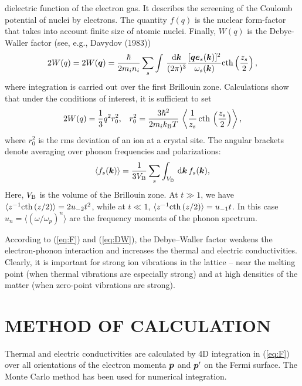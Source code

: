 dielectric function of the electron gas. It describes
the screening of the Coulomb
potential of nuclei by electrons. The quantity $f(q)$ is the nuclear
form-factor that takes into account finite size of atomic nuclei. Finally,
$W(q)$ is the Debye-Waller factor (see, e.g., Davydov (1983))
%
\begin{equation}
        2 W(q) = 2W(\mbox{\boldmath $q$}) = {\hbar \over 2 m_i n_i}
                \sum_s \int \, { \mbox{d} \mbox{\boldmath $k$} \over (2 \pi)^3 }
                { [\mbox{\boldmath $q$} \mbox{\boldmath $e$}_s(\mbox{\boldmath $k$})]^2 \over
                 \omega_s(\mbox{\boldmath $k$})}
                {\rm cth} \left( {z_s \over 2} \right),
\label{eq:DWgeneral}
\end{equation}
%
where integration is carried out over the first Brillouin zone.
Calculations show that under the conditions of interest, it is sufficient
to set
%
\begin{equation}
       2W(q) = {1 \over 3} q^2 r_0^2, \; \; \;
       r_0^2 = {3 \hbar^2 \over 2 m_i k_{\rm B} T} \,
               \left\langle  {1 \over z_s}\, {\rm cth}\,
               \left( { z_s \over 2} \right) \right\rangle ,
\label{eq:DW}
\end{equation}
%
where $r_0^2$ is the rms deviation of an ion at a crystal site. The
angular brackets denote averaging over phonon frequencies and
polarizations:
%
\begin{equation}
     \langle f_s(\mbox{\boldmath $k$}) \rangle =
     {1 \over 3 V_{\rm B} } \sum_s \int_{V_{\rm B}} \, \mbox{d} \mbox{\boldmath $k$} \,
     f_s(\mbox{\boldmath $k$}),
\label{eq:averaging}
\end{equation}
%
Here, $V_{\rm B}$ is the volume of the Brillouin zone. At $t \gg 1$, we have
$\langle z^{-1} {\rm cth} \,(z/2) \rangle = 2 u_{-2}t^{2}$, 
while at $t \ll 1$, $\langle z^{-1} {\rm cth} \,(z/2) \rangle = u_{-1}t$.
In this case $u_n = \langle (\omega / \omega_p)^n \rangle$ are the frequency
moments of the phonon spectrum.

According to (\ref{eq:F}) and (\ref{eq:DW}), 
the Debye--Waller factor weakens the electron-phonon interaction
and increases the thermal and electric conductivities. Clearly,
it is important for strong ion vibrations in the lattice -- 
near the melting point (when thermal vibrations are especially strong) 
and at high densities of the matter (when zero-point vibrations are strong).

\section{METHOD OF CALCULATION}
Thermal and electric conductivities are calculated by 4D
integration in (\ref{eq:F}) over all orientations of the 
electron momenta $\mbox{\boldmath $p$}$ and $\mbox{\boldmath $p$}'$ on the Fermi surface. The
Monte Carlo method has been used for numerical integration.


